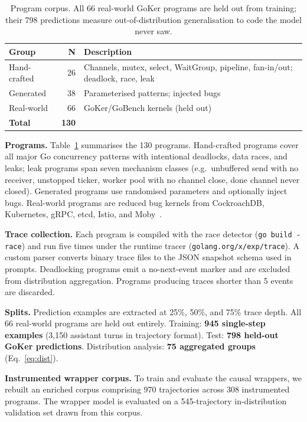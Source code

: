 \documentclass[10pt,conference]{IEEEtran}
\begin{document}
\begin{table}[t]
\centering
\caption{Program corpus. All 66 real-world GoKer programs are held
out from training; their 798 predictions measure out-of-distribution
generalisation to code the model never saw.}
\label{tab:corpus}
\vspace*{8pt}
\small
\begin{tabular}{@{}lrp{3.2cm}@{}}
\toprule
\textbf{Group} & \textbf{N} & \textbf{Description}\\
\midrule
Hand-crafted & 26 & Channels, mutex, select, WaitGroup, pipeline, fan-in/out; deadlock, race, leak\\
Generated    & 38 & Parameterised patterns; injected bugs\\
Real-world   & 66 & GoKer/GoBench kernels (held out)\\
\midrule
\textbf{Total} & \textbf{130} & \\
\bottomrule
\end{tabular}
\end{table}

\textbf{Programs.}
Table~\ref{tab:corpus} summarises the 130 programs.
Hand-crafted programs cover all major Go concurrency patterns with
intentional deadlocks, data races, and leaks; leak programs span seven
mechanism classes (e.g.\ unbuffered send with no receiver, unstopped
ticker, worker pool with no channel close, done channel never closed).
Generated programs use randomised parameters and optionally inject bugs.
Real-world programs are reduced bug kernels from CockroachDB,
Kubernetes, gRPC, etcd, Istio, and Moby~\cite{goker,gobench}.

\textbf{Trace collection.}
Each program is compiled with the race detector
(\texttt{go build -race}) and run five times under the runtime tracer
(\texttt{golang.org/x/exp/trace}).
A custom parser converts binary trace files to the JSON snapshot schema
used in prompts.
Deadlocking programs emit a no-next-event marker and are excluded from
distribution aggregation.
Programs producing traces shorter than 5 events are discarded.

\textbf{Splits.}
Prediction examples are extracted at 25\%, 50\%, and 75\% trace depth.
All 66 real-world programs are held out entirely.
Training: \textbf{945 single-step examples} (3,150 assistant turns in
trajectory format).
Test: \textbf{798 held-out GoKer predictions}.
Distribution analysis: \textbf{75 aggregated groups} (Eq.~\eqref{eq:dist}).

\textbf{Instrumented wrapper corpus.} To train and evaluate the causal wrappers, we rebuilt an enriched corpus comprising 970 trajectories across 308 instrumented programs. The wrapper model is evaluated on a 545-trajectory in-distribution validation set drawn from this corpus.
\end{document}
